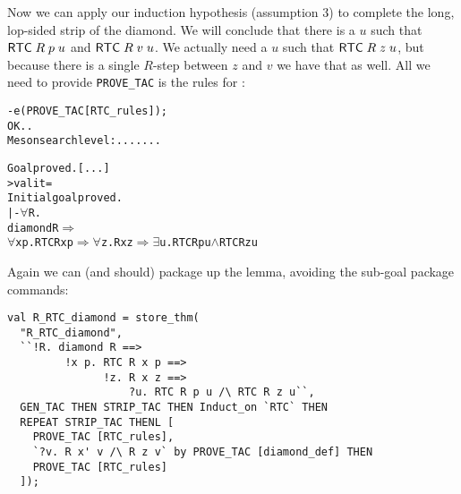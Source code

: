 Now we can apply our induction hypothesis (assumption 3) to complete
the long, lop-sided strip of the diamond.  We will conclude that there
is a $u$ such that ${\sf RTC}\;R\;p\;u$ and ${\sf RTC}\;R\;v\;u$.  We
actually need a $u$ such that ${\sf RTC}\;R\;z\;u$, but because there
is a single $R$-step between $z$ and $v$ we have that as well.  All
we need to provide \texttt{PROVE\_TAC} is the rules for :
\begin{session}
\begin{alltt}
- e (PROVE_TAC [RTC_rules]);
OK..
Meson search level: .......

Goal proved. [...]
> val it =
    Initial goal proved.
    |- \(\forall\)R.
         diamond R \(\Rightarrow\)
         \(\forall\)x p. RTC R x p \(\Rightarrow\) \(\forall\)z. R x z \(\Rightarrow\) \(\exists\)u. RTC R p u \(\land\) RTC R z u
\end{alltt}
\end{session}
    Again we can (and should) package up the lemma, avoiding the
    sub-goal package commands:
\begin{session}
\begin{verbatim}
val R_RTC_diamond = store_thm(
  "R_RTC_diamond",
  ``!R. diamond R ==>
         !x p. RTC R x p ==>
               !z. R x z ==>
                   ?u. RTC R p u /\ RTC R z u``,
  GEN_TAC THEN STRIP_TAC THEN Induct_on `RTC` THEN
  REPEAT STRIP_TAC THENL [
    PROVE_TAC [RTC_rules],
    `?v. R x' v /\ R z v` by PROVE_TAC [diamond_def] THEN
    PROVE_TAC [RTC_rules]
  ]);
\end{verbatim}
\end{session}
\eos{}


